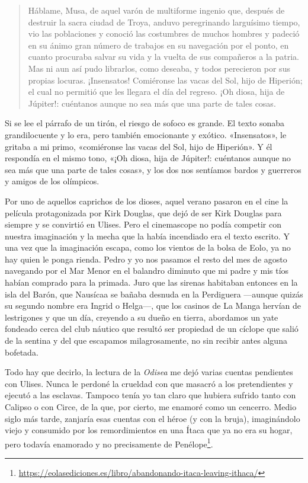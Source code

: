 \documentclass[11pt,a4paper]{article}
\begin{document}
\begin{quote}
\small
Háblame, Musa, de aquel varón de multiforme ingenio que, después de destruir la sacra ciudad de Troya, anduvo peregrinando larguísimo tiempo, vio las poblaciones y conoció las costumbres de muchos hombres y padeció en su ánimo gran número de trabajos en su navegación por el ponto, en cuanto procuraba salvar su vida y la vuelta de sus compañeros a la patria. Mas ni aun así pudo librarlos, como deseaba, y todos perecieron por sus propias locuras. ¡Insensatos! Comiéronse las vacas del Sol, hijo de Hiperión; el cual no permitió que les llegara el día del regreso. ¡Oh diosa, hija de Júpiter!: cuéntanos aunque no sea más que una parte de tales cosas.
\end{quote}

Si se lee el párrafo de un tirón, el riesgo de sofoco es grande. El texto sonaba grandilocuente y lo era, pero también emocionante y exótico. «Insensatos», le gritaba a mi primo, «comiéronse las vacas del Sol, hijo de Hiperión». Y él respondía en el mismo tono, «¡Oh diosa, hija de Júpiter!: cuéntanos aunque no sea más que una parte de tales cosas», y los dos nos sentíamos bardos y guerreros y amigos de los olímpicos.

Por uno de aquellos caprichos de los dioses, aquel verano pasaron en el cine la película protagonizada por Kirk Douglas, que dejó de ser Kirk Douglas para siempre y se convirtió en Ulises. Pero el cinemascope no podía competir con nuestra imaginación y la mecha que la había incendiado era el texto escrito. Y una vez que la imaginación escapa, como los vientos de la bolsa de Eolo, ya no hay quien le ponga rienda. Pedro y yo nos pasamos el resto del mes de agosto navegando por el Mar Menor en el balandro diminuto que mi padre y mis tíos habían comprado para la primada. Juro que las sirenas habitaban entonces en la isla del Barón, que Nausícaa se bañaba desnuda en la Perdiguera ---aunque quizás su segundo nombre era Ingrid o Helga---, que los casinos de La Manga hervían de lestrigones y que un día, creyendo a su dueño en tierra, abordamos un yate fondeado cerca del club náutico que resultó ser propiedad de un cíclope que salió de la sentina y del que escapamos milagrosamente, no sin recibir antes alguna bofetada.

Todo hay que decirlo, la lectura de la \emph{Odisea} me dejó varias cuentas pendientes con Ulises. Nunca le perdoné la crueldad con que masacró a los pretendientes y ejecutó a las esclavas. Tampoco tenía yo tan claro que hubiera sufrido tanto con Calipso o con Circe, de la que, por cierto, me enamoré como un cencerro. Medio siglo más tarde, zanjaría esas cuentas con el héroe (y con la bruja), imaginándolo viejo y consumido por los remordimientos en una Ítaca que ya no era su hogar, pero todavía enamorado y no precisamente de Penélope\footnote{\url{https://eolasediciones.es/libro/abandonando-itaca-leaving-ithaca/}}.
\end{document}
